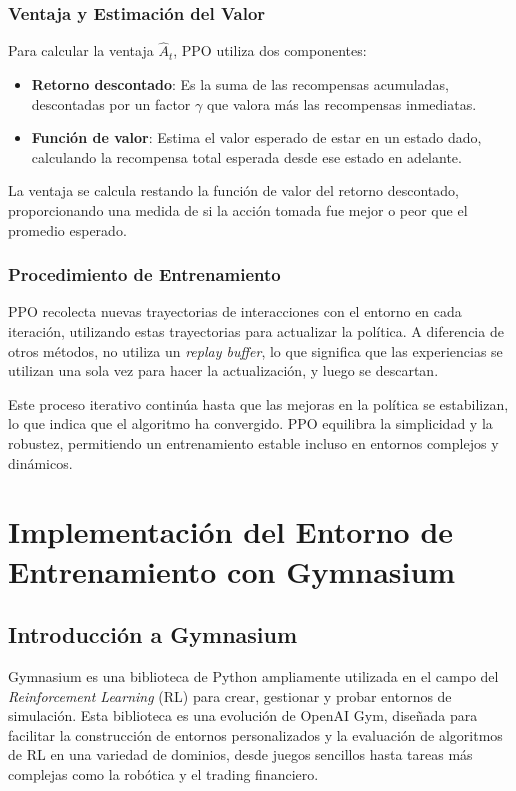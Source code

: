 \documentclass[a4paper,12pt]{report}
\begin{document}
\subsubsection{Ventaja y Estimación del Valor}

Para calcular la ventaja \(\hat{A}_t\), PPO utiliza dos componentes:

\begin{itemize}
    \item \textbf{Retorno descontado}: Es la suma de las recompensas acumuladas, descontadas 
    por un factor \(\gamma\) que valora más las recompensas inmediatas.
    \item \textbf{Función de valor}: Estima el valor esperado de estar en un estado dado, 
    calculando la recompensa total esperada desde ese estado en adelante.
\end{itemize}

La ventaja se calcula restando la función de valor del retorno descontado, proporcionando 
una medida de si la acción tomada fue mejor o peor que el promedio esperado.

\subsubsection{Procedimiento de Entrenamiento}

PPO recolecta nuevas trayectorias de interacciones con el entorno en cada iteración, 
utilizando estas trayectorias para actualizar la política. A diferencia de otros métodos, 
no utiliza un \textit{replay buffer}, lo que significa que las experiencias se utilizan 
una sola vez para hacer la actualización, y luego se descartan.

Este proceso iterativo continúa hasta que las mejoras en la política se estabilizan, 
lo que indica que el algoritmo ha convergido. PPO equilibra la simplicidad y la robustez, 
permitiendo un entrenamiento estable incluso en entornos complejos y dinámicos.

\section{Implementación del Entorno de Entrenamiento con Gymnasium}

\subsection{Introducción a Gymnasium}

Gymnasium es una biblioteca de Python ampliamente utilizada en el campo del 
\textit{Reinforcement Learning} (RL) para crear, gestionar y probar entornos 
de simulación. Esta biblioteca es una evolución de OpenAI Gym, diseñada para 
facilitar la construcción de entornos personalizados y la evaluación de algoritmos 
de RL en una variedad de dominios, desde juegos sencillos hasta tareas más complejas 
como la robótica y el trading financiero.
\end{document}
